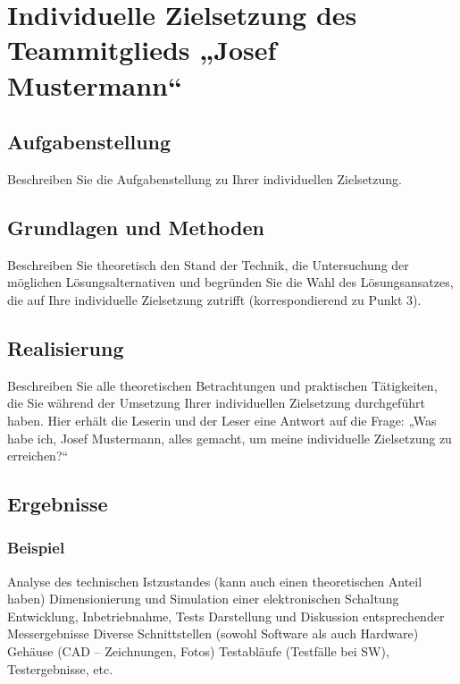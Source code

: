 \section{Individuelle Zielsetzung des Teammitglieds „Josef
Mustermann“}\label{sec:student1main}
\subsection{Aufgabenstellung}\label{sec:student1tasks}

Beschreiben Sie die Aufgabenstellung zu Ihrer individuellen Zielsetzung.
\subsection{Grundlagen und Methoden}\label{sec:student1methods}

Beschreiben Sie theoretisch den Stand der Technik, die Untersuchung der möglichen Lösungsalternativen und begründen Sie die Wahl des Lösungsansatzes, die auf Ihre individuelle Zielsetzung zutrifft (korrespondierend zu Punkt 3). 

\subsection{Realisierung}\label{sec:studentAwork}

Beschreiben Sie alle theoretischen Betrachtungen und praktischen Tätigkeiten, die Sie während der Umsetzung Ihrer individuellen Zielsetzung durchgeführt haben. 
Hier erhält die Leserin und der Leser eine Antwort auf die Frage: „Was habe ich, Josef Mustermann, alles gemacht, um meine individuelle Zielsetzung zu erreichen?“

\subsection{Ergebnisse}\label{sec:student1results}

\subsubsection{Beispiel}
Analyse des technischen Istzustandes (kann auch einen theoretischen Anteil
haben) Dimensionierung und Simulation einer elektronischen Schaltung
Entwicklung, Inbetriebnahme, Tests
Darstellung und Diskussion entsprechender Messergebnisse
Diverse Schnittstellen (sowohl Software als auch Hardware)
Gehäuse (CAD – Zeichnungen, Fotos)
Testabläufe (Testfälle bei SW), Testergebnisse, etc.

